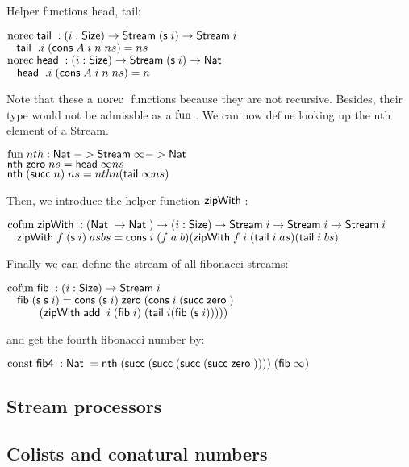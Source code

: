 Helper functions head, tail:
\begin{bsp}
$\norec \tail : \EPi{i}{\Size}\Stream (\s i) \ra \Stream i$\\
$\spc \tail \; .i \; (\cons A \; i \; n \; ns) = ns$\\
$\norec \head : \EPi{i}{\Size}\Stream (\s i) \ra \Nat$\\
$\spc \head \; .i \; (\cons A \; i \; n \; ns) = n$
\end{bsp}
Note that these a $\norec$ functions because they are not recursive. Besides, their type would not be admissble as a $\fun$.
We can now define looking up the nth element of a Stream.
\begin{bsp}
$\fun nth : \Nat -> \Stream \infty -> \Nat$\\
$\nth \zero ns = \head \infty ns$\\
$\nth (\suc n) \; ns = nth n (\tail \infty ns)$\\
\end{bsp}
Then, we introduce the helper function $\zipWith$:
\begin{bsp}
$\cofun \zipWith : (\Nat \ra \Nat ) \ra \EPi{i}{\Size}{\Stream i \ra \Stream i \ra \Stream i}$ \\
$\spc \zipWith f \; (\s i) \; as bs = \cons i \; (f \; a \; b) (\zipWith f \; i \; (\tail i \; as) (\tail i \; bs)$
\end{bsp}
Finally we can define the stream of all fibonacci streams:
\begin{bsp}
$\cofun \fib : \EPi{i}{\Size}\Stream i$\\
$\spc \fib (\s \s i) = \cons (\s i) \; \zero (\cons i \; (\suc \zero)$\\
$\spcx (\zipWith \add \; i \; (\fib i) \; (\tail i (\fib (\s i)))))$
\end{bsp}
and get the fourth fibonacci number by:
\begin{bsp}
$\const \fibf : \Nat = \nth (\suc (\suc (\suc (\suc \zero )))) \; (\fib \infty)$
\end{bsp}
\subsection{Stream processors}
\subsection{Colists and conatural numbers}
